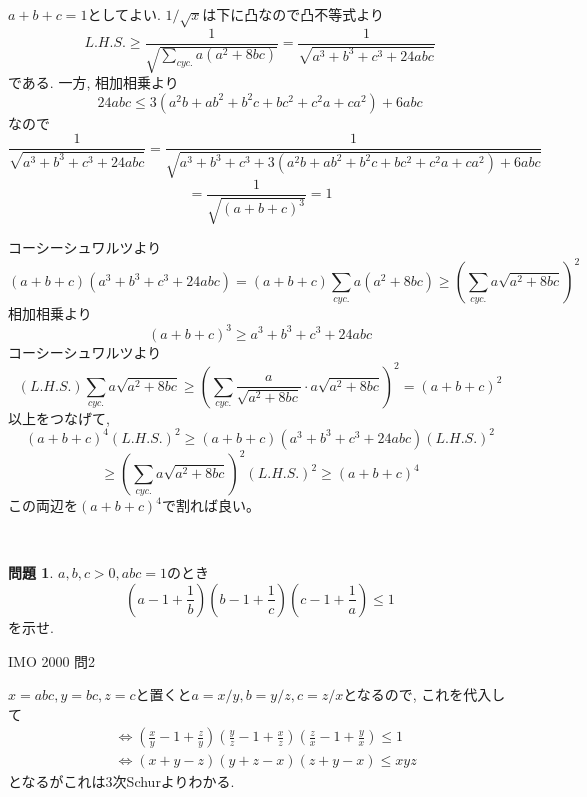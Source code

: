 \documentclass[uplatex, a5paper]{jsarticle}
\makeatletter
\theoremstyle{definition}
\newtheorem{prob}{問題}
\renewenvironment{proof}[1][\proofname]{
  \pushQED{\qed}%
  \normalfont \topsep6\p@\@plus6\p@\relax
  \trivlist
  \item[\hskip\labelsep
    #1\@addpunct{\textbf{.}}]\ignorespaces
}{%
  \popQED\endtrivlist\@endpefalse
}
\providecommand{\proofname}{証明}
\def\qed{\hfill $\Box$}
\makeatother
\begin{document}
\begin{proof}
  \(a+b+c=1\)としてよい. \(1/\sqrt{x}\)は下に凸なので凸不等式より
  \[
  L.H.S. \geq \frac{1}{\sqrt{ \sum_{cyc.} a(a^2+8bc) }} = \frac{1}{\sqrt{ a^3+b^3+c^3+24abc }}
  \]
  である. 一方, 相加相乗より
  \[
  24abc \leq 3(a^2b+ab^2+b^2c+bc^2+c^2a+ca^2) + 6abc
  \]
  なので
  \[
  \frac{1}{\sqrt{ a^3+b^3+c^3+24abc }}
  = \frac{1}{\sqrt{ a^3+b^3+c^3+3(a^2b+ab^2+b^2c+bc^2+c^2a+ca^2) + 6abc }}
  \]
  \[
  = \frac{1}{\sqrt{(a+b+c)^3}} =1
  \]
\end{proof}


\begin{proof}
  コーシーシュワルツより
  \[
  (a+b+c)(a^3+b^3+c^3+24abc ) = (a+b+c)\sum_{cyc.} a(a^2+8bc) \geq \left( \sum_{cyc.} a\sqrt{a^2+8bc} \right) ^2
  \]
  相加相乗より
  \[
  (a+b+c) ^3 \geq a^3+b^3+c^3+24abc
  \]
  コーシーシュワルツより
  \[
  ( L.H.S.) \sum_{cyc.}a\sqrt{a^2+8bc}
  \geq \left( \sum_{cyc.}\frac{a}{\sqrt{a^2+8bc}}\cdot a\sqrt{a^2+8bc} \right) ^2 = (a+b+c)^2
  \]
  以上をつなげて,
  \[
  (a+b+c)^4(L.H.S.) ^2 \geq (a+b+c)(a^3+b^3+c^3 +24abc) (L.H.S.)^2
  \]
  \[
  \geq \left( \sum_{cyc.} a\sqrt{a^2+8bc} \right) ^2 (L.H.S.)^2 \geq (a+b+c)^4
  \]
  この両辺を\((a+b+c)^4\)で割れば良い。
\end{proof}






\




\newpage

\begin{prob}
  \(a,b,c> 0 , abc=1\)のとき
  \[
  \left( a-1 +\frac{1}{b} \right) \left( b-1+\frac{1}{c} \right) \left( c-1+\frac{1}{a} \right) \leq 1
  \]
  を示せ.
  \begin{flushright}
    IMO 2000 問2
  \end{flushright}
\end{prob}


\begin{proof}
  \(x=abc, y=bc,z=c\)と置くと\(a=x/y,b=y/z,c=z/x\)となるので, これを代入して
  \begin{align*}
    &\Leftrightarrow
    \left( \frac{x}{y}-1 +\frac{z}{y} \right)
    \left( \frac{y}{z}-1+\frac{x}{z} \right) \left( \frac{z}{x}-1+\frac{y}{x} \right) \leq 1  \\
    &\Leftrightarrow (x+y-z)(y+z-x)(z+y-x) \leq xyz
  \end{align*}
  となるがこれは\(3\)次Schurよりわかる.
\end{proof}
\end{document}
